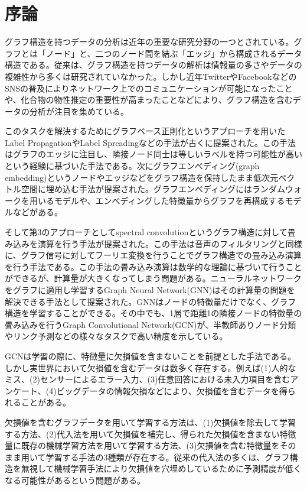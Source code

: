 \chapter{序論}
グラフ構造を持つデータの分析は近年の重要な研究分野の一つとされている。グラフとは「ノード」と、二つのノード間を結ぶ「エッジ」から構成されるデータ構造である。従来は、グラフ構造を持つデータの解析は情報量の多さやデータの複雑性から多くは研究されていなかった。しかし近年TwitterやFacebookなどのSNSの普及によりネットワーク上でのコミュニケーションが可能になったこと\cite{FreemanSocialNetwork}や、化合物の物性推定の重要性が高まったこと\cite{duvenaud2015convolutional}などにより、グラフ構造を含むデータの分析が注目を集めている。

このタスクを解決するためにグラフベース正則化\cite{belkin2004regularization}というアプローチを用いたLabel Propagation\cite{zhu2003semi}やLabel Spreading\cite{zhou2004learning}などの手法が古くに提案された。この手法はグラフのエッジに注目し、隣接ノード同士は等しいラベルを持つ可能性が高いという経験に基づいた手法である。次にグラフエンべディング(graph embedding)というノードやエッジなどをグラフ構造を保持したまま低次元ベクトル空間に埋め込む手法が提案された。グラフエンべディングにはランダムウォークを用いるモデル\cite{Perozzi2014deep}や、エンべディングした特徴量からグラフを再構成するモデル\cite{tang2015line}などがある。

そして第3のアプローチとしてspectral convolution\cite{bruna2013spectral}というグラフ構造に対して畳み込みを演算を行う手法が提案された。この手法は音声のフィルタリングと同様に、グラフ信号に対してフーリエ変換を行うことでグラフ構造での畳み込み演算を行う手法である。この手法の畳み込み演算は数学的な理論に基づいて行うことができるが、計算量が大きくなってしまう問題がある。ニューラルネットワークをグラフに適用し学習するGraph Neural Network(GNN)はその計算量の問題を解決できる手法として提案された。GNNはノードの特徴量だけでなく、グラフ構造を学習することができる。その中でも、1層で距離1の隣接ノードの特徴量の畳み込みを行うGraph Convolutional Network(GCN)\cite{kipf2016GCN}が、半教師ありノード分類やリンク予測などの様々なタスクで高い精度を示している。

GCNは学習の際に、特徴量に欠損値を含まないことを前提とした手法である。しかし実世界において欠損値を含むデータは数多く存在する。例えば(1)人的なミス、(2)センサーによるエラー入力、(3)任意回答における未入力項目を含むアンケート、(4)ビッグデータの情報欠損などにより、欠損値を含むデータを得られることがある。

欠損値を含むグラフデータを用いて学習する方法は、(1)欠損値を除去して学習する方法、(2)代入法を用いて欠損値を補完し、得られた欠損値を含まない特徴量に既存の機械学習方法を用いて学習する方法、(3)欠損値を含む特徴量をそのまま用いて学習する手法の3種類が存在する。従来の代入法の多くは、グラフ構造を無視して機械学習手法により欠損値を穴埋めしているために予測精度が低くなる可能性があるという問題がある。

